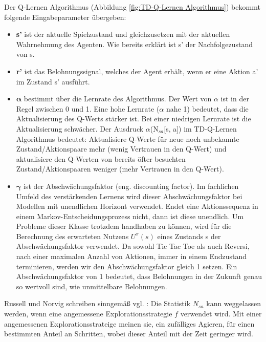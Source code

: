 Der Q-Lernen Algorithmus (Abbildung \ref{fig:TD-Q-Lernen Algorithmus}) bekommt folgende Eingabeparameter übergeben:

\begin{itemize}
\item \textbf{s'} ist der aktuelle Spielzustand und gleichzusetzen mit der aktuellen Wahrnehmung des Agenten. Wie bereits erklärt ist s' der Nachfolgezustand von s.

\item \textbf{r'} ist das Belohnungssignal, welches der Agent erhält, wenn er eine Aktion a' im Zustand s' ausführt. 

\item $\boldsymbol{\alpha}$ bestimmt über die Lernrate des Algorithmus. Der Wert von $\alpha$ ist in der Regel zwischen 0 und 1. Eine hohe Lernrate ($\alpha$ nahe 1) bedeutet, dass die Aktualisierung des Q-Werts stärker ist. Bei einer niedrigen Lernrate ist die Aktualisierung schwächer. Der Ausdruck $\alpha$(N$_{sa}$[s, a]) im TD-Q-Lernen Algorithmus bedeutet: Aktualisiere Q-Werte für neue noch unbekannte Zustand/Aktionspaare mehr (wenig Vertrauen in den Q-Wert) und aktualisiere den Q-Werten von bereits öfter besuchten Zustand/Aktionspaaren weniger (mehr Vertrauen in den Q-Wert). 

\item $\boldsymbol{\gamma}$ ist der Abschwächungsfaktor (eng. discounting factor). Im fachlichen Umfeld des verstärkenden Lernens wird dieser Abschwächungsfaktor bei Modellen mit unendlichen Horizont verwendet. Endet eine Aktionssequenz in einem Markov-Entscheidungsprozess nicht, dann ist diese unendlich. Um Probleme dieser Klasse trotzdem handhaben zu können, wird für die Berechnung des erwarteten Nutzens $U^\pi(s)$ eines Zustands s der Abschwächungsfaktor verwendet. Da sowohl Tic Tac Toe als auch Reversi, nach einer maximalen Anzahl von Aktionen, immer in einem Endzustand terminieren, werden wir den Abschwächungsfaktor gleich 1 setzen. Ein Abschwächungsfaktor von 1 bedeutet, dass Belohnungen in der Zukunft genau so wertvoll sind, wie unmittelbare Belohnungen. 
\end{itemize} 

Russell und Norvig schreiben sinngemäß vgl. \cite[974]{Russell}: Die Statistik $N_{sa}$ kann weggelassen werden, wenn eine angemessene Explorationsstrategie $f$ verwendet wird. Mit einer angemessenen Explorationsstrateige meinen sie, ein zufälliges Agieren, für einen bestimmten Anteil an Schritten, wobei dieser Anteil mit der Zeit geringer wird. \\

